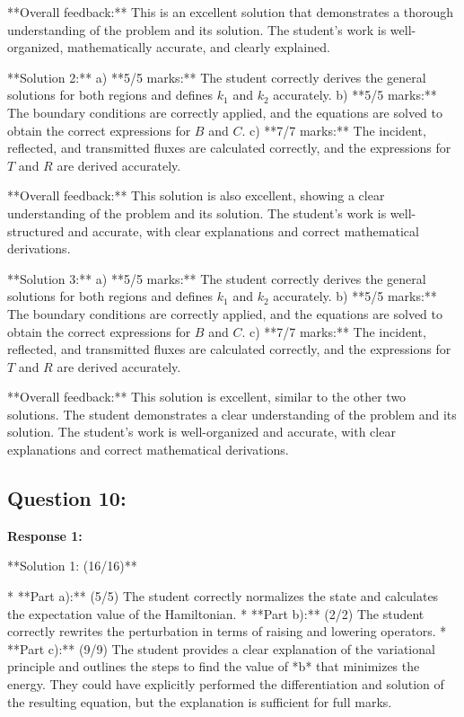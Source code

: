\documentclass[a4paper,11pt]{article}
\begin{document}
**Overall feedback:** This is an excellent solution that demonstrates a thorough understanding of the problem and its solution. The student's work is well-organized, mathematically accurate, and clearly explained.

**Solution 2:**
a) **5/5 marks:** The student correctly derives the general solutions for both regions and defines \( k_1 \) and \( k_2 \) accurately. 
b) **5/5 marks:** The boundary conditions are correctly applied, and the equations are solved to obtain the correct expressions for \(B\) and \(C\).
c) **7/7 marks:** The incident, reflected, and transmitted fluxes are calculated correctly, and the expressions for \(T\) and \(R\) are derived accurately.

**Overall feedback:** This solution is also excellent, showing a clear understanding of the problem and its solution. The student's work is well-structured and accurate, with clear explanations and correct mathematical derivations.

**Solution 3:**
a) **5/5 marks:** The student correctly derives the general solutions for both regions and defines \( k_1 \) and \( k_2 \) accurately.
b) **5/5 marks:** The boundary conditions are correctly applied, and the equations are solved to obtain the correct expressions for \(B\) and \(C\).
c) **7/7 marks:** The incident, reflected, and transmitted fluxes are calculated correctly, and the expressions for \(T\) and \(R\) are derived accurately.

**Overall feedback:** This solution is excellent, similar to the other two solutions. The student demonstrates a clear understanding of the problem and its solution. The student's work is well-organized and accurate, with clear explanations and correct mathematical derivations.


\subsection*{Question 10:}

\textbf{Response 1:}

**Solution 1: (16/16)**

*   **Part a):** (5/5) The student correctly normalizes the state and calculates the expectation value of the Hamiltonian.
*   **Part b):** (2/2) The student correctly rewrites the perturbation in terms of raising and lowering operators.
*   **Part c):** (9/9) The student provides a clear explanation of the variational principle and outlines the steps to find the value of *b* that minimizes the energy. They could have explicitly performed the differentiation and solution of the resulting equation, but the explanation is sufficient for full marks.
\end{document}
